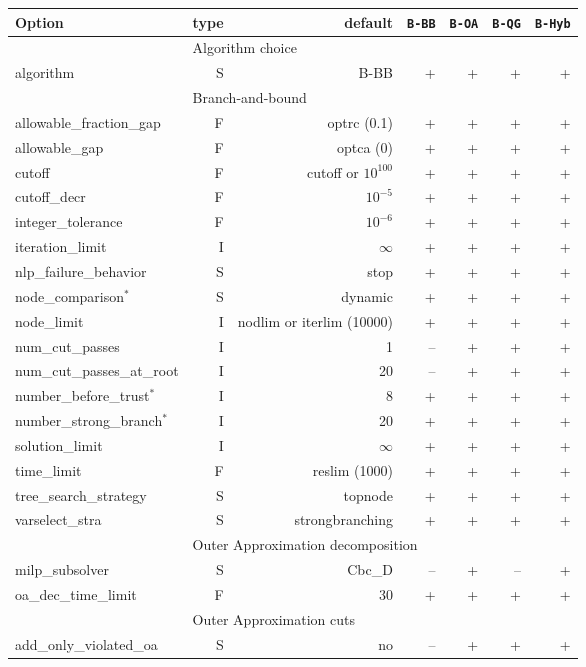 \begin{center}
\begin{tabular}{|l|r|r|r|r|r|r|}\hline
Option & type &  default & {\tt B-BB} & {\tt B-OA} & {\tt B-QG} & {\tt B-Hyb} \\
\hline
\hline
\multicolumn{1}{|c}{} & \multicolumn{6}{l|}{Algorithm choice}\\
\hline
algorithm& S& B-BB& +& +& +& +\\
\hline
\multicolumn{1}{|c}{} & \multicolumn{6}{l|}{Branch-and-bound}\\
\hline
allowable\_fraction\_gap& F& optrc (0.1)& +& +& +& +\\
allowable\_gap& F& optca (0)& +& +& +& +\\
cutoff& F& cutoff or $10^{100}$& +& +& +& +\\
cutoff\_decr& F& $10^{-5}$& +& +& +& +\\
integer\_tolerance& F& $10^{-6}$& +& +& +& +\\
iteration\_limit& I& $\infty$& +& +& +& +\\
nlp\_failure\_behavior& S& stop& +& +& +& +\\
node\_comparison$^*$& S& dynamic& +& +& +& +\\
node\_limit& I& nodlim or iterlim (10000)& +& +& +& +\\
num\_cut\_passes& I& 1& --& +& +& +\\
num\_cut\_passes\_at\_root& I& 20& --& +& +& +\\
number\_before\_trust$^*$& I& 8& +& +& +& +\\
number\_strong\_branch$^*$& I& 20& +& +& +& +\\
solution\_limit& I& $\infty$& +& +& +& +\\
time\_limit& F& reslim (1000)& +& +& +& +\\
tree\_search\_strategy& S& top\-node& +& +& +& +\\
varselect\_stra& S& strong\-branching& +& +& +& +\\
\hline
\multicolumn{1}{|c}{} & \multicolumn{6}{l|}{Outer Approximation decomposition}\\
\hline
milp\_subsolver& S& Cbc\_D& --& +& --& +\\
oa\_dec\_time\_limit& F& 30& +& +& +& +\\
\hline
\multicolumn{1}{|c}{} & \multicolumn{6}{l|}{Outer Approximation cuts}\\
\hline
add\_only\_violated\_oa& S& no& --& +& +& +\\

\end{tabular}
\end{center}
